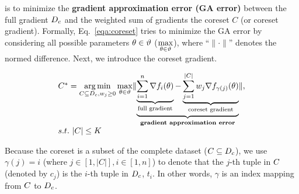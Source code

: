 is to minimize the {\bf gradient approximation error (GA error)} between the full gradient \wrt $D_c$ and the weighted sum of gradients \wrt the coreset $C$ (or coreset gradient).
Formally, Eq.~\ref{eqa:coreset} tries to minimize the  GA error 
by considering all possible parameters $\theta\in\vartheta$ (\ie $\max\limits_{\theta\in\vartheta}$), where ``$\| \cdot \|$'' denotes the normed difference. Next, we introduce the coreset gradient.

\vspace{-1em}
\begin{equation}\label{eqa:coreset}
\begin{array}{l}
\core^* = \argmin\limits_{C\subseteq \trainc, w_j \geq 0}
\max\limits_{\hypo\in\vartheta}
\lVert 
\underbrace{
	\underbrace{\sum\limits_{i=1}^n\df_i(\hypo)}_{\text{full gradient}} - 
	\underbrace{\sum\limits_{j=1}^{|C|}w_j\df_{\gamma(j)}(\hypo)}_{\text{coreset gradient}} 
}_{\textbf{gradient approximation error}}
\rVert, 
\\ 
s.t.~|C| \le \numcore %
\end{array}
\end{equation}




%
Because the coreset is a subset of the complete dataset (\ie $C \subseteq D_c$),
we use $\gamma(j) = i$ (where $j\in[1,|C|], i\in[1,n]$) to denote that the $j$-th tuple in $C$ (denoted by $c_j$) is the $i$-th tuple in $D_c$, \ie $t_i$. In other words, $\gamma$ is an index mapping from $C$ to $D_c$. 

